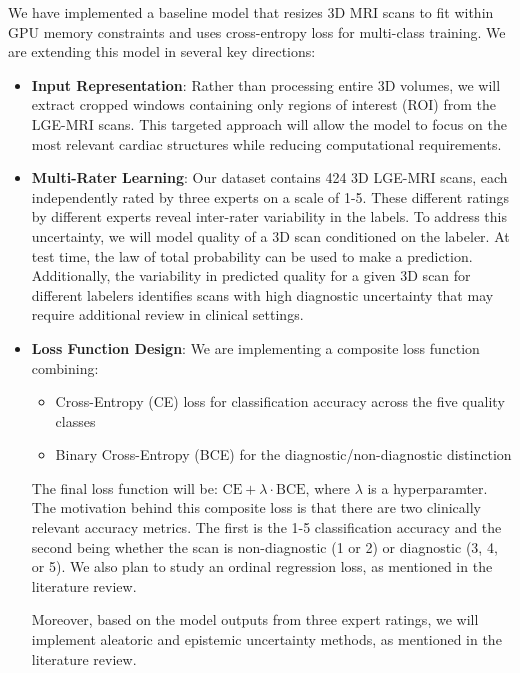 \documentclass{report}
\begin{document}
We have implemented a baseline model that resizes 3D MRI scans to fit within GPU memory constraints and uses cross-entropy loss for multi-class training. We are extending this model in several key directions:

\begin{itemize}
    \item \textbf{Input Representation}: Rather than processing entire 3D volumes, we will extract cropped windows containing only regions of interest (ROI) from the LGE-MRI scans. This targeted approach will allow the model to focus on the most relevant cardiac structures while reducing computational requirements.

    \item \textbf{Multi-Rater Learning}: Our dataset contains 424 3D LGE-MRI scans, each independently rated by three experts on a scale of 1-5. These different ratings by different experts reveal inter-rater variability in the labels. To address this uncertainty, we will model quality of a 3D scan conditioned on the labeler. At test time, the law of total probability can be used to make a prediction. Additionally, the variability in predicted quality for a given 3D scan for different labelers identifies scans with high diagnostic uncertainty that may require additional review in clinical settings.

    \item \textbf{Loss Function Design}: We are implementing a composite loss function combining:
    \begin{itemize}
    \item Cross-Entropy (CE) loss for classification accuracy across the five quality classes
    \item Binary Cross-Entropy (BCE) for the diagnostic/non-diagnostic distinction
    \end{itemize}
    The final loss function will be: $\text{CE} + \lambda \cdot \text{BCE}$, where $\lambda$ is a hyperparamter. The motivation behind this composite loss is that there are two clinically relevant accuracy metrics. The first is the 1-5 classification accuracy and the second being whether the scan is non-diagnostic (1 or 2) or diagnostic (3, 4, or 5). We also plan to study an ordinal regression loss, as mentioned in the literature review.
    
    Moreover, based on the model outputs from three expert ratings, we will implement aleatoric and epistemic uncertainty methods, as mentioned in the literature review.
\end{itemize}
\end{document}
